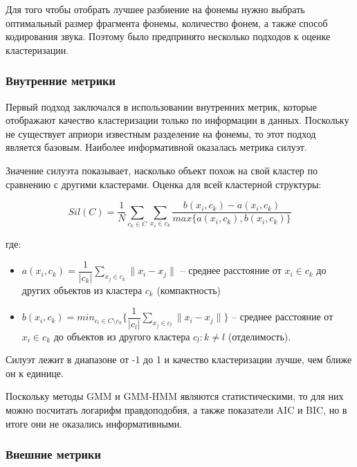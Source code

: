 \documentclass[a4paper,14pt]{extarticle}
\begin{document}
Для того чтобы отобрать лучшее разбиение на фонемы нужно выбрать оптимальный размер фрагмента фонемы, количество фонем, а также способ кодирования звука. Поэтому было предпринято несколько подходов к оценке кластеризации.

\subsubsection{Внутренние метрики}
Первый подход заключался в использовании внутренних метрик, которые отображают качество кластеризации только по информации в данных. Поскольку не существует априори известным разделение на фонемы, то этот подход является базовым. Наиболее информативной оказалась метрика силуэт.

Значение силуэта показывает, насколько объект похож на свой кластер по сравнению с другими кластерами. Оценка для всей кластерной структуры:


$$
Sil\left( C \right) = \dfrac{1}{N} \sum_{c_k \in C} \sum_{x_i \in c_k} \dfrac{ b(x_i, c_k) - a(x_i, c_k) }{ max \{ a(x_i, c_k), b(x_i, c_k) \}  }
$$

где:
\begin{itemize}
	\item $a(x_i, c_k) = \dfrac{1}{|c_k|} \sum_{x_j \in c_k} \|x_i - x_j\|$ – среднее расстояние от $x_i \in c_k$ до других объектов из кластера $c_k$ (компактность)
	\item $b(x_i, c_k) = min_{c_l \in C \setminus c_k } \{ \dfrac{1}{|c_l|} \sum_{x_j \in c_l} \|x_i - x_j\| \}$ – среднее расстояние от $x_i \in c_k$ до объектов из другого кластера $c_l: k \neq l$ (отделимость).
\end{itemize}

Силуэт лежит в диапазоне от -1 до 1 и качество кластеризации лучше, чем ближе он к единице. 

Поскольку методы GMM и GMM-HMM являются статистическими, то для них можно посчитать логарифм правдоподобия, а также показатели AIC и BIC, но в итоге они не оказались информативными.

\subsubsection{Внешние метрики}
\end{document}
